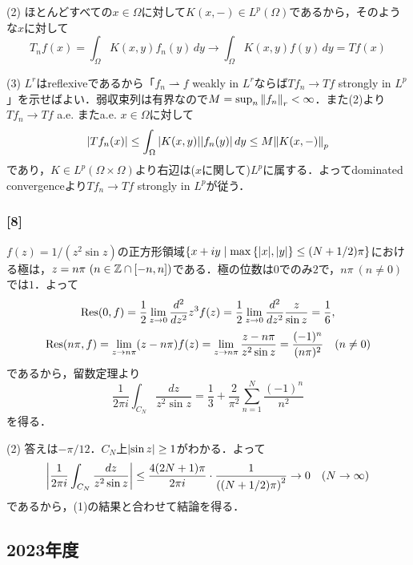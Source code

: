 \documentclass[a4j]{ltjsarticle}
\newcommand{\Zset}{\mathbb{Z}}
\newcommand{\1}{\mathbbm{1}}
\numberwithin{equation}{section}
\theoremstyle{definition}
\begin{document}
(2) ほとんどすべての$x\in \Omega$に対して$K(x,-)\in L^p(\Omega)$であるから，そのような$x$に対して
\begin{equation}
    T_nf(x)=\int_{\Omega}K(x,y)f_n(y)\,dy \to \int_{\Omega}K(x,y)f(y)\,dy=Tf(x)
\end{equation}

(3) $L^r$はreflexiveであるから「$f_n\rightharpoonup f$ weakly in $L^r$ならば$Tf_n\to Tf$ strongly in $L^p$」を示せばよい．弱収束列は有界なので$M=\sup_{n}\norm{f_n}_r<\infty$．また(2)より$Tf_n\to Tf$ a.e. またa.e. $x\in \Omega$に対して
\begin{equation}
    \abs{Tf_n(x)}\leq \int_{\Omega}\abs{K(x,y)}\abs{f_n(y)}\,dy\leq M\norm{K(x,-)}_{p}
\end{equation}
であり，$K\in L^p(\Omega\times \Omega)$より右辺は($x$に関して)$L^p$に属する．よってdominated convergenceより$Tf_n\to Tf$ strongly in $L^p$が従う．
\subsubsection*{[8]}
$f(z)=1/(z^2\sin z)$の正方形領域$\qty{x+iy\mid \max\qty{\abs{x},\abs{y}}\leq (N+1/2)\pi}$における極は，$z=n\pi\ (n\in \Zset\cap\qty[-n,n])$である．極の位数は$0$でのみ$2$で，$n\pi\ (n\neq0)$では$1$．よって
\begin{equation}
    \Residue(0,f)=\frac{1}{2}\lim_{z\to0}\frac{d^2}{dz^2}z^3f(z)=\frac{1}{2}\lim_{z\to0}\frac{d^2}{dz^2}\frac{z}{\sin z}=\frac{1}{6},
\end{equation}
\begin{equation}
    \Res(n\pi,f)=\lim_{z\to n\pi}(z-n\pi)f(z)=\lim_{z\to n\pi}\frac{z-n\pi}{z^2\sin z}=\frac{(-1)^n}{(n\pi)^2}\quad (n\neq0)
\end{equation}
であるから，留数定理より
\begin{equation}
    \frac{1}{2\pi i}\int_{C_N}\frac{dz}{z^2\sin z}=\frac{1}{3}+\frac{2}{\pi^2}\sum_{n=1}^N\frac{(-1)^n}{n^2}
\end{equation}
を得る．

(2) 答えは$-\pi/12$．$C_N$上$\abs{\sin z}\geq 1$がわかる．よって
\begin{equation}
    \abs{\frac{1}{2\pi i}\int_{C_N}\frac{dz}{z^2\sin z}}\leq \frac{4(2N+1)\pi}{2\pi i}\cdot \frac{1}{\qty(\qty(N+1/2)\pi)^2}\to0\quad (N\to\infty)
\end{equation}
であるから，(1)の結果と合わせて結論を得る．
\subsection{2023年度}
\end{document}
